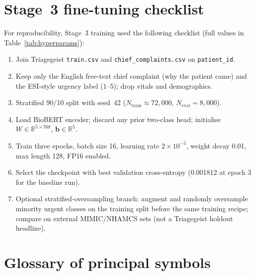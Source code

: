\chapter{Stage~3 fine-tuning checklist}

For reproducibility, Stage~3 training used the following checklist (full values in Table~\ref{tab:hyperparams}):

\begin{enumerate}
\item Join Triagegeist \texttt{train.csv} and \texttt{chief\_complaints.csv} on \texttt{patient\_id}.
\item Keep only the English free-text chief complaint (why the patient came) and the ESI-style urgency label (\(1\)--\(5\)); drop vitals and demographics.
\item Stratified 90/10 split with seed~42 (\(N_{\mathrm{train}}\approx 72{,}000\), \(N_{\mathrm{eval}}=8{,}000\)).
\item Load BioBERT encoder; discard any prior two-class head; initialise \(W\in\mathbb{R}^{5\times 768}\), \(\mathbf{b}\in\mathbb{R}^{5}\).
\item Train three epochs, batch size 16, learning rate \(2\times 10^{-5}\), weight decay 0.01, max length 128, FP16 enabled.
\item Select the checkpoint with best validation cross-entropy (0.001812 at epoch 3 for the baseline run).
\item Optional stratified-oversampling branch: augment and randomly oversample minority urgent classes on the training split before the same training recipe; compare on external MIMIC/NHAMCS sets (not a Triagegeist holdout headline).
\end{enumerate}

\chapter{Glossary of principal symbols}

